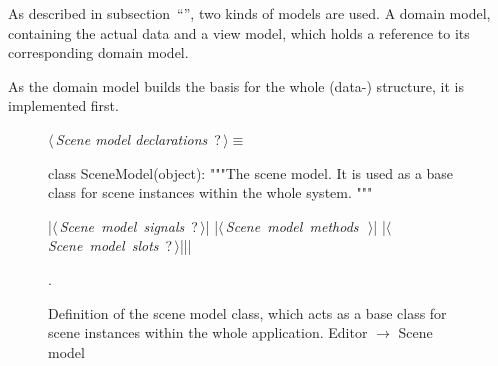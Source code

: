 \documentclass[%
    a4paper,    %
    justified,  %
    nobib,      %
    openany     %
]{tufte-book}
\makeatletter
\renewcommand{\label}[1]{\@tufte@label{##1}}%
\makeatother
\begin{document}

As described in subsection~\enquote{},
two kinds of models are used. A domain model, containing the actual data and a
view model, which holds a reference to its corresponding domain model.

%

As the domain model builds the basis for the whole (data-) structure, it is
implemented first.

\begin{figure}
\begin{flushleft} \small
\begin{minipage}{\linewidth}\label{scrap21}\raggedright\small
{} $\langle\,${\itshape Scene model declarations}\nobreak\ {\footnotesize {?}}$\,\rangle\equiv$
\vspace{-1ex}
\begin{pythoncode}
class SceneModel(object):
    """The scene model.
    It is used as a base class for scene instances within the
    whole system.
    """

    |\hbox{$\langle\,${\itshape Scene model signals}\nobreak\ {\footnotesize ?}$\,\rangle$}|
    |\hbox{$\langle\,${\itshape Scene model methods}\nobreak\ {\footnotesize {}}$\,\rangle$}|
    |\hbox{$\langle\,${\itshape Scene model slots}\nobreak\ {\footnotesize ?}$\,\rangle$}||\NWsep|
\end{pythoncode}
\vspace{1.5ex}
\footnotesize
\begin{list}{}{\setlength{\itemsep}{-\parsep}\setlength{\itemindent}{-\leftmargin}}
\item {\NWtxtMacroNoRef}.

\item{}
\end{list}
\end{minipage}\vspace{4ex}
\end{flushleft}
\caption{Definition of the scene model class, which acts as a base class for
scene instances within the whole application.
  \newline{}\newline{}Editor $\rightarrow$ Scene model}
\label{editor:lst:scene-model}
\end{figure}
\end{document}
